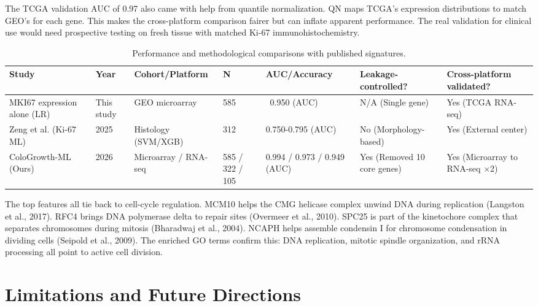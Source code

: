\documentclass[11pt]{article}
\begin{document}
The TCGA validation AUC of 0.97 also came with help from quantile normalization. QN maps TCGA's expression distributions to match GEO's for each gene. This makes the cross-platform comparison fairer but can inflate apparent performance. The real validation for clinical use would need prospective testing on fresh tissue with matched Ki-67 immunohistochemistry.

\begin{table}[H]
\centering
\caption{Performance and methodological comparisons with published signatures.}
\begin{tabular}{lllllll}
\toprule
\textbf{Study} & \textbf{Year} & \textbf{Cohort/Platform} & \textbf{N} & \textbf{AUC/Accuracy} & \textbf{Leakage-controlled?} & \textbf{Cross-platform validated?} \\
\midrule
  MKI67 expression alone (LR) & This study & GEO microarray & 585 & ~0.950 (AUC) & N/A (Single gene) & Yes (TCGA RNA-seq) \\
  Zeng et al. (Ki-67 ML) & 2025 & Histology (SVM/XGB) & 312 & 0.750-0.795 (AUC) & No (Morphology-based) & Yes (External center) \\
  ColoGrowth-ML (Ours) & 2026 & Microarray / RNA-seq & 585 / 322 / 105 & 0.994 / 0.973 / 0.949 (AUC) & Yes (Removed 10 core genes) & Yes (Microarray to RNA-seq ×2) \\
\bottomrule
\end{tabular}
\end{table}

The top features all tie back to cell-cycle regulation. MCM10 helps the CMG helicase complex unwind DNA during replication (Langston et al., 2017). RFC4 brings DNA polymerase delta to repair sites (Overmeer et al., 2010). SPC25 is part of the kinetochore complex that separates chromosomes during mitosis (Bharadwaj et al., 2004). NCAPH helps assemble condensin I for chromosome condensation in dividing cells (Seipold et al., 2009). The enriched GO terms confirm this: DNA replication, mitotic spindle organization, and rRNA processing all point to active cell division.

\section{Limitations and Future Directions}
\end{document}
